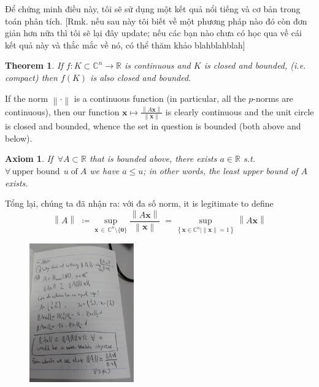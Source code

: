 \documentclass{article}
\newcommand{\norm}[1]{\left\lVert#1\right\rVert}
\newtheorem*{theorem}{Theorem}
\newtheorem*{axiom}{Axiom}
\begin{document}
Để chứng minh điều này, tôi sẽ sử dụng một kết quả nổi tiếng và cơ bản trong toán phân tích. [Rmk. nếu sau này tôi biết về một phương pháp nào đó còn đơn giản hơn nữa thì tôi sẽ lại đây update; nếu các bạn nào chưa có học qua về cái kết quả này và thắc mắc về nó, có thể thăm khảo blahblahblah] 

\begin{theorem}
If $f: K \subset \mathbb{C}^n \to \mathbb{R}$ is continuous and $K$ is closed and bounded, (i.e. compact)
then $f(K)$ is also closed and bounded.
\end{theorem}

If the norm $\norm{\cdot}$ is a continuous function (in particular, all the $p$-norms are continuous), then our function $\mathbf{x} \mapsto \frac{\norm{A\mathbf{x}}}{\norm{\mathbf{x}}}$ is clearly continuous and the unit circle is closed and bounded, whence the set in question is bounded (both above and below).


\begin{axiom}
	If $\,\forall A \subset \mathbb{R}$ that is bounded above, there exists $a \in \mathbb{R}$ s.t. $\forall\, \text{upper bound}\;\, u\; \text{of}\; A$ we have $a \le u$; in other words, the \textit{least upper bound} of $A$ exists.
\end{axiom}


Tổng lại, chúng ta đã nhận ra:\newline
với đa số norm, it is legitimate to define 
$$
  \norm{A}
	\,\,\coloneqq\!\!
	\sup_{\mathbf{x} \,\in\, {\mathbb{C}^{n} \setminus \{\mathbf{0}\}}} \frac{\norm{A\mathbf{x}}}{\norm{\mathbf{x}}}\;
	= 
	\sup_{\left\{\mathbf{x} \in \mathbb{C}^n \vert \norm{\mathbf{x}} = 1\right\}} \norm{A\mathbf{x}}
$$













\begin{figure}
\includegraphics[width=0.4\textwidth]{01-motivation.jpg}
\end{figure}
\end{document}

